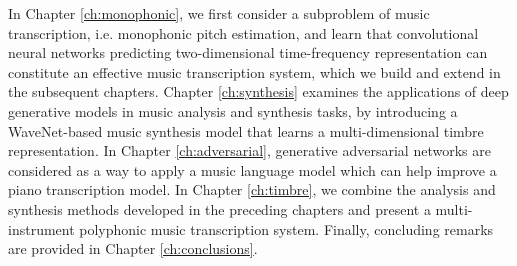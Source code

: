In Chapter \ref{ch:monophonic}, we first consider a subproblem of music transcription, i.e. monophonic pitch estimation, and learn that convolutional neural networks predicting two-dimensional time-frequency representation can constitute an effective music transcription system, which we build and extend in the subsequent chapters.
Chapter \ref{ch:synthesis} examines the applications of deep generative models in music analysis and synthesis tasks, by introducing a WaveNet-based music synthesis model that learns a multi-dimensional timbre representation.
In Chapter \ref{ch:adversarial}, generative adversarial networks are considered as a way to apply a music language model which can help improve a piano transcription model.
In Chapter \ref{ch:timbre}, we combine the analysis and synthesis methods developed in the preceding chapters and present a multi-instrument polyphonic music transcription system.
Finally, concluding remarks are provided in Chapter \ref{ch:conclusions}.



